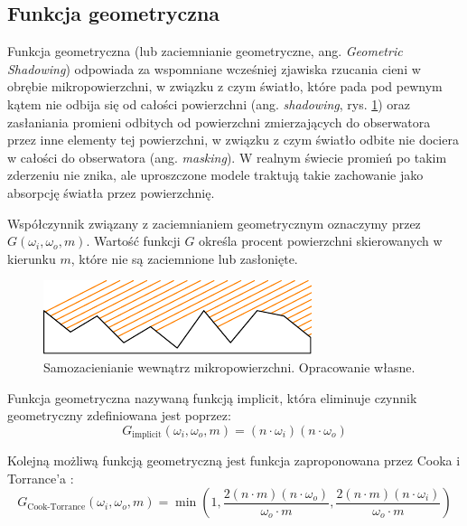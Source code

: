 \documentclass[../main.tex]{subfiles}
\begin{document}
\subsection{Funkcja geometryczna}

Funkcja geometryczna (lub zaciemnianie geometryczne, ang. \textit{Geometric
Shadowing}) odpowiada za wspomniane wcześniej zjawiska rzucania cieni w obrębie
mikropowierzchni, w związku z czym światło, które pada pod pewnym kątem nie
odbija się od całości powierzchni (ang. \textit{shadowing}, rys.
\ref{fig:GeometricShadowing}) oraz zasłaniania promieni odbitych od powierzchni
zmierzających do obserwatora przez inne elementy tej powierzchni, w związku z
czym światło odbite nie dociera w całości do obserwatora (ang.
\textit{masking}). W realnym świecie promień po takim zderzeniu nie znika, ale
uproszczone modele traktują takie zachowanie jako absorpcję światła przez
powierzchnię.

Współczynnik związany z zaciemnianiem geometrycznym oznaczymy przez $G(\omega_i,\omega_o,m)$.
Wartość funkcji $G$ określa procent powierzchni skierowanych w kierunku
$m$, które nie są zaciemnione lub zasłonięte.

\begin{figure}[h]
  \centering
  \includegraphics{illustrations/pbr/geometry_shadowing.pdf}
  \vspace{0.25cm}
  \caption{Samozacienianie wewnątrz mikropowierzchni. Opracowanie własne.}
  \label{fig:GeometricShadowing}
\end{figure}

Funkcja geometryczna nazywaną funkcją implicit, która eliminuje czynnik geometryczny zdefiniowana jest poprzez:
\begin{equation}
  G_{\text{implicit}}(\omega_i, \omega_o, m) =
    (n \cdot \omega_i) (n \cdot \omega_o)
\end{equation}

Kolejną możliwą funkcją geometryczną jest funkcja zaproponowana przez Cooka i Torrance'a \cite{CookTorrance}:
\begin{equation}
  G_{\text{Cook-Torrance}}(\omega_i,\omega_o,m) =
    \min \left(
      1,
      \frac{2(n \cdot m)(n \cdot \omega_o)}{
        \omega_o \cdot m
      },
      \frac{2(n \cdot m)(n \cdot \omega_i)}{
        \omega_o \cdot m
      }
    \right)
\end{equation}
\end{document}

